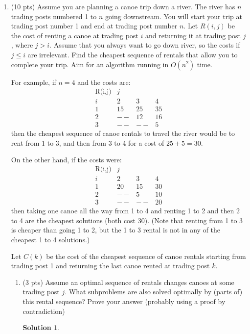 \documentclass[11pt]{article}
\newtheorem*{solution}{Solution}
\begin{document}
\begin{enumerate}
 \item (10 pts) Assume you are planning a canoe trip down a river.
The river has $n$ trading posts numbered 1 to $n$ going downstream.
You will start your trip at trading post number 1 and end at trading 
post number $n$.  
Let $R(i,j)$ be the cost of renting a canoe at trading post
$i$ and returning it at trading post $j$, where $j> i$.
Assume that you always want to go down river, so the costs if $j\leq i$ 
are irrelevant.  Find the cheapest sequence of rentals that 
allow you to complete your trip.
Aim for an algorithm running in $O(n^2)$ time.

For example, if $n=4$ and the costs are:
\[
\begin{array}{lccc} 
\mbox{R(i,j)} &  {j}  \\ 
{i} &   2 &   3 &   4 \\ \hline
1   &  15 &  25 &  35 \\
2   &  -- &  12 &  16 \\
3   &  -- & -- & 5
\end{array}
\]
then the cheapest sequence of canoe rentals to travel the river
would be to rent from 1 to 3, and then from 3 to 4 for a cost of $25+5=30$.

On the other hand, if the costs were:
\[
\begin{array}{lccc} 
\mbox{R(i,j)} & {j}  \\
{i} &   2 &   3 &   4 \\ \hline
1   &  20 &  15 &  30 \\
2   &  -- &  5 &  10 \\
3   &  -- & -- & 20
\end{array}
\]
then taking one canoe all the way from 1 to 4 and 
renting 1 to 2 and then 2 to 4 are the cheapest solutions (both cost 30). 
(Note that renting from 1 to 3 is cheaper than going 1 to 2, but the 
1 to 3 rental is not in any of the cheapest 1 to 4 solutions.)

Let $C(k)$ be the cost of the cheapest sequence of canoe rentals starting
from trading post 1 and returning the last canoe rented at trading post $k$.
\newpage
\begin{enumerate}
\item (3 pts)  Assume an optimal sequence of rentals changes canoes at
some trading post $j$.  What subproblems are also solved optimally
by (parts of) this rental sequence?  Prove your answer (probably using a proof by contradiction)
\begin{solution}

\end{solution}
\newpage


\end{enumerate}
\end{enumerate}
\end{document}

